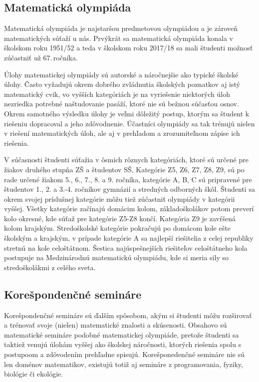 \documentclass[11pt,a4paper,oneside,final]{book}
\begin{document}
\subsection*{Matematická olympiáda}

Matematická olympiáda je najstaršou predmetovou olympiádou a je zároveň  matematických súťaží u nás. Prvýkrát sa matematická olympiáda konala v školskom roku 1951/52 a teda v školskom roku 2017/18 sa mali študenti možnosť zúčastniť už 67.\,ročníka.

Úlohy matematickej olympiády sú autorské a náročnejšie ako typické školské úlohy. Často vyžadujú okrem dobrého zvládnutia školských poznatkov aj istý matematický cvik, vo vyšších kategóriách je na vyriešenie niektorých úloh nezriedka potrebné naštudovanie pasáží, ktoré nie sú bežnou súčasťou osnov. Okrem samotného výsledku úlohy je veľmi dôležitý postup, ktorým sa študent k riešeniu dopracoval a jeho zdôvodnenie. Účastníci olympiády sa tak trénujú nielen v riešení matematických úloh, ale aj v prehľadom a zrozumiteľnom zápise ich riešenia.

V súčasnosti študenti súťažia v ôsmich rôznych kategóriách, ktoré sú určené pre žiakov druhého stupňa ZŠ a študentov SŠ, Kategórie Z5, Z6, Z7, Z8, Z9, sú po rade určené žiakom 5., 6., 7., 8. a 9. ročníka, kategórie A, B, C sú pripravené pre študentov 1., 2. a 3.-4. ročníkov gymnázií a stredných odborných škôl. Študenti sa okrem svojej príslušnej kategórie môžu tiež zúčastniť olympiády v kategórii vyššej. Všetky kategórie začínajú domácim kolom, základoškolákov potom preverí kolo okresné, kde súťaž pre kategórie Z5-Z8 končí. Kategória Z9 je zavŕšená kolom krajským. Stredoškolské kategórie pokračujú po domácom kole ešte školským a krajským, v prípade kategórie A sa najlepší riešitelia z celej republiky stretnú na kole celoštátnom. Šestica najúspešnejších riešiteľov celoštátneho kola postupuje na Medzinárodnú matematickú olympiádu, kde si meria sily so stredoškolákmi z celého sveta.



\subsection*{Korešpondenčné semináre}

Korešpondenčné semináre sú ďalším spôsobom, akým si študenti môžu rozširovať a trénovať svoje (nielen) matematické znalosti a skúsenosti. Obsahovo sú matematické semináre podobné matematickej olympiáde, pretože študenti sa taktiež venujú úlohám vyššej ako školskej náročnosti, ktorých riešenia spolu s postupoom a zdôvodením prehľadne spisujú. Korešponedenčné semináre nie sú len doménov matematikov, existujú totiž aj semináre z programovania, fyziky, biológie či ekológie.
\end{document}
